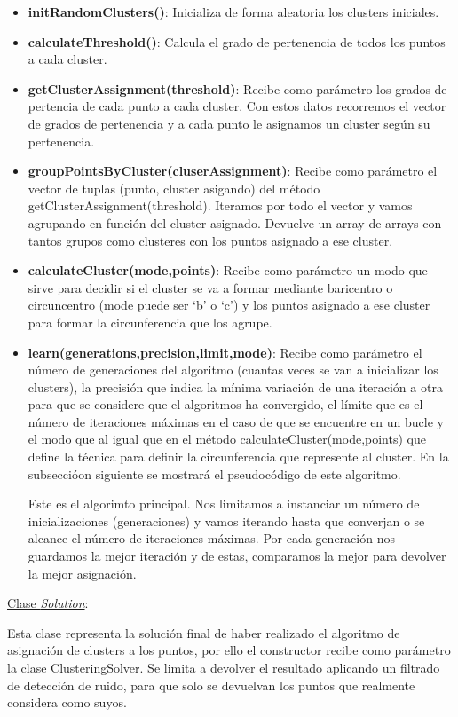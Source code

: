 \documentclass[conference,a4paper]{IEEEtran}
\begin{document}
\begin{itemize}

	\item{\textbf{initRandomClusters()}: Inicializa de forma aleatoria los clusters iniciales.}
	\item{\textbf{calculateThreshold()}: Calcula el grado de pertenencia de todos los puntos a cada cluster.}
	\item{\textbf{getClusterAssignment(threshold)}: Recibe como parámetro los grados de pertencia de cada punto a cada cluster. Con estos datos recorremos el vector de grados de pertenencia y a cada punto le asignamos un cluster según su pertenencia.}
	\item{\textbf{groupPointsByCluster(cluserAssignment)}: Recibe como parámetro el vector de tuplas (punto, cluster asigando) del método getClusterAssignment(threshold). Iteramos por todo el vector y vamos agrupando en función del cluster asignado. Devuelve un array de arrays con tantos grupos como clusteres con los puntos asignado a ese cluster.}
	\item{\textbf{calculateCluster(mode,points)}: Recibe como parámetro un modo que sirve para decidir si el cluster se va a formar mediante baricentro o circuncentro (mode puede ser ‘b’ o ‘c’) y los puntos asignado a ese cluster para formar la circunferencia que los agrupe.}
	\item{\textbf{learn(generations,precision,limit,mode)}: Recibe como parámetro el número de generaciones del algoritmo (cuantas veces se van a inicializar los clusters), la precisión que indica la mínima variación de una iteración a otra para que se considere que el algoritmos ha convergido, el límite que es el número de iteraciones máximas en el caso de que se encuentre en un bucle y el modo que al igual que en el método calculateCluster(mode,points) que define la técnica para definir la circunferencia que represente al cluster. En la subseccióon siguiente se mostrará el pseudocódigo de este algoritmo.

Este es el algorimto principal. Nos limitamos a instanciar un número de inicializaciones (generaciones) y vamos iterando hasta que converjan o se alcance el número de iteraciones máximas. Por cada generación nos guardamos la mejor iteración y de estas, comparamos la mejor para devolver la mejor asignación.}

\end{itemize}

\underline{Clase \textit{Solution}}:

Esta clase representa la solución final de haber realizado el algoritmo de asignación de clusters a los puntos, por ello el constructor recibe como parámetro la clase ClusteringSolver. Se limita a devolver el resultado aplicando un filtrado de detección de ruido, para que solo se devuelvan los puntos que realmente considera como suyos.
\end{document}
